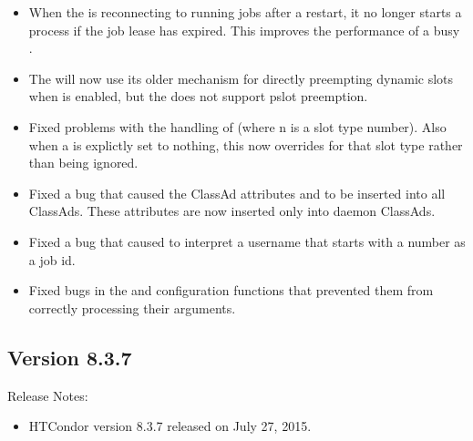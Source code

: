 \begin{itemize}
\item When the  is reconnecting to running jobs after
a restart, 
it no longer starts a  process if the job lease has expired.
This improves the performance of a busy .

\item The  will now use its older mechanism for directly
preempting dynamic slots when  is enabled,
but the  does not support pslot preemption.

\item Fixed problems with the handling of 
(where n is a slot type number). Also when a  is explictly set
to nothing, this now overrides  for that slot type rather than being ignored.

\item Fixed a bug that caused the ClassAd attributes  and 
to be inserted into all ClassAds.  These attributes are now inserted only into daemon ClassAds.

\item Fixed a bug that caused  to interpret a username that starts with a number as a job id.

\item Fixed bugs in the  and  configuration functions
that prevented them from correctly processing their arguments.

\end{itemize}

\subsection*{\label{sec:New-8-3-7}Version 8.3.7}

\noindent Release Notes:

\begin{itemize}

\item HTCondor version 8.3.7 released on July 27, 2015.

\end{itemize}


